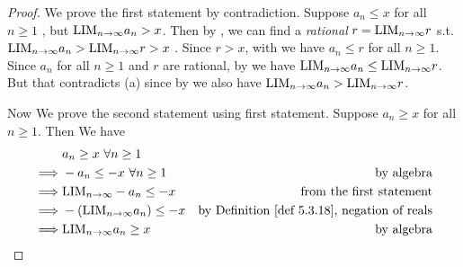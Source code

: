 \begin{proof}
We prove the first statement by contradiction.
Suppose \(a_n \le x\) for all \(n \ge 1\) , but \(\text{LIM}_{n \to \infty} a_n > x\).
Then by , we can find a \emph{rational} \(r = \text{LIM}_{n \to \infty} r\) s.t. \(\text{LIM}_{n \to \infty} a_n > \text{LIM}_{n \to \infty} r > x\) .
Since \(r > x\), with  we have \(a_n \le r\) for all \(n \ge 1\).
Since \(a_n\) for all \(n \ge 1\) and \(r\) are rational, by  we have \(\text{LIM}_{n \to \infty} a_n \le \text{LIM}_{n \to \infty} r\).
But that contradicts (a) since by  we also have \(\text{LIM}_{n \to \infty} a_n > \text{LIM}_{n \to \infty} r\).

Now We prove the second statement using first statement.
Suppose \(a_n \ge x\) for all \(n \geq 1\).
Then We have
\begin{align*}
             & a_n \ge x\ \forall n \ge 1 \\
    \implies & -a_n \le -x\ \forall n \ge 1 & \text{by algebra} \\
    \implies & \LIM_{n \toINF} -a_n \le -x & \text{from the first statement} \\
    \implies & -(\LIM_{n \toINF} a_n) \le -x & \text{by \DEF{5.3.18}, negation of reals} \\
    \implies & \LIM_{n \toINF} a_n \ge x & \text{by algebra}
\end{align*}
\end{proof}